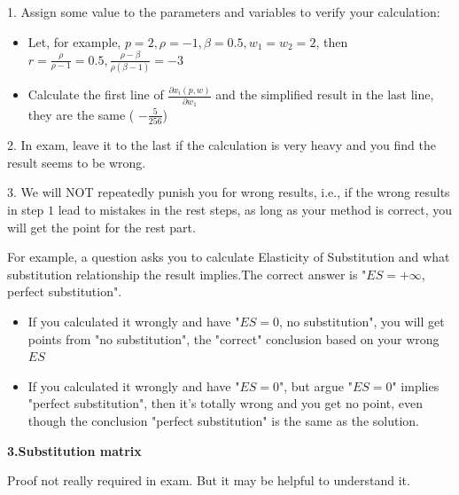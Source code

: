 \documentclass{article}
\begin{document}
\begin{mdframed}[backgroundcolor=yellow!20,linecolor=white]
1. Assign some value to the parameters and variables to verify your calculation:

\begin{itemize}
\item Let, for example, $p = 2, \rho = -1, \beta = 0.5, w_1 = w_2 = 2$, then $r =  \frac{\rho}{\rho -1} = 0.5 , \frac{\rho -\beta}{\rho(\beta -1)} = -3$
\item Calculate the first line of $\frac{\partial x_i(p,w)}{\partial w_1}$ and the simplified result in the last line, they are
the same ( $- \frac{5}{256}$)
\end{itemize}
2. In exam, leave it to the last if the calculation is very heavy and you find the result seems to be wrong.

3. We will NOT repeatedly punish you for wrong results, i.e., if the wrong results in step $1$ lead to mistakes in the rest steps, as long as your method is correct, you will get the point for the rest part. 

For example, a question asks you to calculate Elasticity of Substitution and  what substitution relationship the result implies.The correct answer is "$ES = + \infty$, perfect substitution". 
\begin{itemize}
\item   If you calculated it wrongly and have "$ES = 0$, no substitution", you will get points from "no substitution", the "correct" conclusion based on your wrong $ES$
\item   If you calculated it wrongly and have "$ES = 0$", but argue "$ES = 0$" implies "perfect substitution", then it's
totally wrong and you get no point, even though the conclusion "perfect substitution" is the same as the solution.
\end{itemize}

\end{mdframed}

\vspace{3mm}
\textbf{3.Substitution matrix}

Proof not really required in exam. But it may be helpful to understand it.
\end{document}

